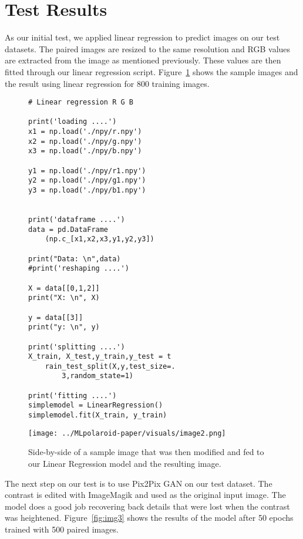 \documentclass[conference]{IEEEtran}
\begin{document}
\section{Test Results}\label{section:TestResults}

As our initial test, we applied linear regression to predict images on our test datasets. The paired images are resized to the same resolution and RGB values are extracted from the image as mentioned previously. These values are then fitted through our linear regression script. Figure~\ref{fig:img2} shows the sample images and the result using linear regression for 800 training images.

\begin{figure}[htb!]
\begin{verbatim}
# Linear regression R G B

print('loading ....')
x1 = np.load('./npy/r.npy')
x2 = np.load('./npy/g.npy')
x3 = np.load('./npy/b.npy')

y1 = np.load('./npy/r1.npy')
y2 = np.load('./npy/g1.npy')
y3 = np.load('./npy/b1.npy')


print('dataframe ....')
data = pd.DataFrame
	(np.c_[x1,x2,x3,y1,y2,y3])

print("Data: \n",data)
#print('reshaping ....')

X = data[[0,1,2]]
print("X: \n", X)

y = data[[3]]
print("y: \n", y)

print('splitting ....')
X_train, X_test,y_train,y_test = t
	rain_test_split(X,y,test_size=.
		3,random_state=1)

print('fitting ....')
simplemodel = LinearRegression()
simplemodel.fit(X_train, y_train)

\end{verbatim}
\end{figure}

\begin{figure}[htb!]
	\begin{center}
	\texttt{[image: ../MLpolaroid-paper/visuals/image2.png]}
	\caption{Side-by-side of a sample image that was then modified and fed to our Linear Regression model and the resulting image.}
	\label{fig:img2} 
	\end{center}
\end{figure}

The next step on our test is to use Pix2Pix GAN on our test dataset. The contrast is edited with ImageMagik and used as the original input image. The model does a good job recovering back details that were lost when the contrast was heightened. Figure~\ref{fig:img3} shows the results of the model after 50 epochs trained with 500 paired images.
\end{document}
